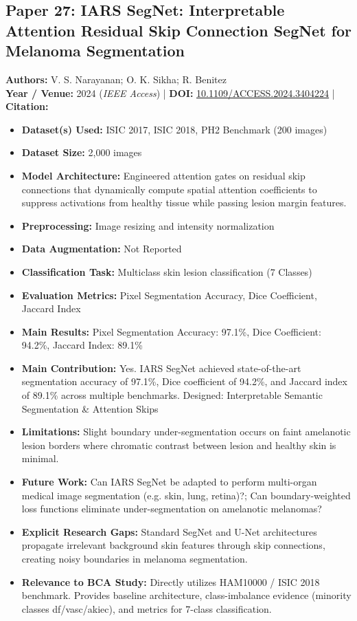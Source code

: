 \documentclass[11pt,a4paper]{article}
\begin{document}
\subsection{Paper 27: IARS SegNet: Interpretable Attention Residual Skip Connection SegNet for Melanoma Segmentation}
\textbf{Authors:} V. S. Narayanan; O. K. Sikha; R. Benitez \\
\textbf{Year / Venue:} 2024 (\textit{IEEE Access}) | \textbf{DOI:} \href{https://doi.org/10.1109/ACCESS.2024.3404224}{10.1109/ACCESS.2024.3404224} | \textbf{Citation:} \cite{10536875}

\begin{itemize}\small
\item \textbf{Dataset(s) Used:} ISIC 2017, ISIC 2018, PH2 Benchmark (200 images)
\item \textbf{Dataset Size:} 2,000 images
\item \textbf{Model Architecture:} Engineered attention gates on residual skip connections that dynamically compute spatial attention coefficients to suppress activations from healthy tissue while passing lesion margin features.
\item \textbf{Preprocessing:} Image resizing and intensity normalization
\item \textbf{Data Augmentation:} Not Reported
\item \textbf{Classification Task:} Multiclass skin lesion classification (7 Classes)
\item \textbf{Evaluation Metrics:} Pixel Segmentation Accuracy, Dice Coefficient, Jaccard Index
\item \textbf{Main Results:} Pixel Segmentation Accuracy: 97.1\%, Dice Coefficient: 94.2\%, Jaccard Index: 89.1\%
\item \textbf{Main Contribution:} Yes. IARS SegNet achieved state-of-the-art segmentation accuracy of 97.1\%, Dice coefficient of 94.2\%, and Jaccard index of 89.1\% across multiple benchmarks. Designed: Interpretable Semantic Segmentation \& Attention Skips
\item \textbf{Limitations:} Slight boundary under-segmentation occurs on faint amelanotic lesion borders where chromatic contrast between lesion and healthy skin is minimal.
\item \textbf{Future Work:} Can IARS SegNet be adapted to perform multi-organ medical image segmentation (e.g. skin, lung, retina)?; Can boundary-weighted loss functions eliminate under-segmentation on amelanotic melanomas?
\item \textbf{Explicit Research Gaps:} Standard SegNet and U-Net architectures propagate irrelevant background skin features through skip connections, creating noisy boundaries in melanoma segmentation.
\item \textbf{Relevance to BCA Study:} Directly utilizes HAM10000 / ISIC 2018 benchmark. Provides baseline architecture, class-imbalance evidence (minority classes df/vasc/akiec), and metrics for 7-class classification.
\end{itemize}
\end{document}
